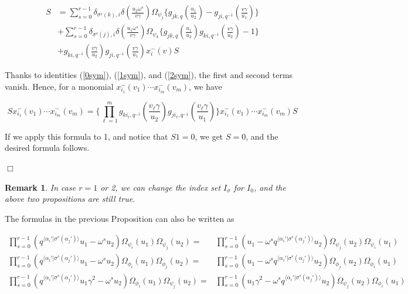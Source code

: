 \documentclass[12pt]{amsart}
\newtheorem{rem}[thm]{Remark}
\numberwithin{equation}{section}
\newcommand{\findem }{\hfill $\Box$ \vskip0.5cm }
\begin{document}
\begin{align*}
    S &= \sum_{s=0}^{r-1}\delta_{\sigma^{s}(k),i}\delta\left(\frac{u_2\omega^s}{v\gamma}\right)\Omega_{\psi_j}\Bigg\{ g_{jk,q}\left(\frac{u_1}{u_2}\right) - g_{ji,q^{-1}}\left(\frac{v\gamma}{u_1}\right)\Bigg\}\\
    &+ \sum_{s=0}^{r-1}\delta_{\sigma^{s}(j),i}\delta\left(\frac{u_1\omega^s}{v\gamma}\right)\Omega_{\psi_k}\Bigg\{ g_{jk,q}\left(\frac{u_1}{u_2}\right)g_{ki,q^{-1}}\left(\frac{v\gamma}{u_2}\right) - 1\Bigg\}\\
    &+ g_{ki,q^{-1}}\left(\frac{v\gamma }{u_2}\right)g_{ji,q^{-1}}\left(\frac{v\gamma}{u_1}\right)x_i^{-}(v)S
\end{align*}

Thanks to identities (\ref{0sym}), (\ref{1sym}), and (\ref{2sym}), the first and second terms vanish. Hence, for a monomial $x_{i_1}^{-}(v_1)\cdots x_{i_m}^{-}(v_m)$, we have 

$$ Sx_{i_1}^{-}(v_1)\cdots x_{i_m}^{-}(v_m) = \Bigg\{\prod_{\ell=1}^{m} g_{ki_\ell,q^{-1}}\left(\frac{v_{\ell}\gamma }{u_2}\right)g_{ji_{\ell},q^{-1}}\left(\frac{v_{\ell}\gamma }{u_1}\right)\Bigg\} x_{i_1}^{-}(v_1)\cdots x_{i_m}^{-}(v_m)S$$

If we apply this formula to 1, and notice that $S1=0$, we get $S=0$, and the desired formula follows.
    
\findem

\begin{rem}
    In case $r=1$ or 2, we can change the index set $I_\sigma$ for $I_0$, and the above two propositions are still true.
\end{rem}

The formulas in the previous Proposition can also be written as

\begin{align}
        \prod_{s=0}^{r-1}(q^{\langle \alpha_i' | \sigma^s(\alpha_j') \rangle}u_1-\omega^su_2)\Omega_{\psi_i}(u_1)\Omega_{\psi_j}(u_2) =& \prod_{s=0}^{r-1}(u_1 - \omega^sq^{\langle \alpha_i' | \sigma^s(\alpha_j')\rangle} u_2)\Omega_{\psi_j}(u_2)\Omega_{\psi_i}(u_1) \label{eq_comm033_gen}\\
        \prod_{s=0}^{r-1}(q^{\langle \alpha_i' | \sigma^s(\alpha_j') \rangle}u_1-\omega^su_2)\Omega_{\phi_i}(u_1)\Omega_{\phi_j}(u_2) =& \prod_{s=0}^{r-1}(u_1 - \omega^sq^{\langle \alpha_i' | \sigma^s(\alpha_j')\rangle} u_2)\Omega_{\phi_j}(u_2)\Omega_{\phi_i}(u_1)\\
        \prod_{s=0}^{r-1}(q^{\langle \alpha_i' | \sigma^s(\alpha_j') \rangle}u_1\gamma^2-\omega^su_2)\Omega_{\phi_i}(u_1)\Omega_{\psi_j}(u_2) =& \prod_{s=0}^{r-1}(u_1\gamma^2 - \omega^sq^{\langle \alpha_i' | \sigma^s(\alpha_j')\rangle} u_2)\Omega_{\psi_j}(u_2)\Omega_{\phi_i}(u_1)
    \end{align}
\end{document}
